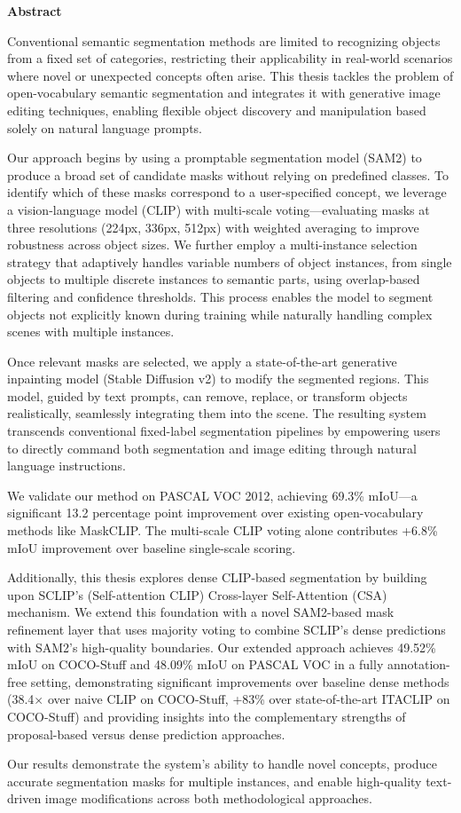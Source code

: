 \vspace{2.5cm}

{\Large \bfseries Abstract}

\vspace{1.5cm}

Conventional semantic segmentation methods are limited to recognizing objects from a fixed set of categories, restricting their applicability in real-world scenarios where novel or unexpected concepts often arise. This thesis tackles the problem of open-vocabulary semantic segmentation and integrates it with generative image editing techniques, enabling flexible object discovery and manipulation based solely on natural language prompts.

Our approach begins by using a promptable segmentation model (SAM2) to produce a broad set of candidate masks without relying on predefined classes. To identify which of these masks correspond to a user-specified concept, we leverage a vision-language model (CLIP) with multi-scale voting—evaluating masks at three resolutions (224px, 336px, 512px) with weighted averaging to improve robustness across object sizes. We further employ a multi-instance selection strategy that adaptively handles variable numbers of object instances, from single objects to multiple discrete instances to semantic parts, using overlap-based filtering and confidence thresholds. This process enables the model to segment objects not explicitly known during training while naturally handling complex scenes with multiple instances.

Once relevant masks are selected, we apply a state-of-the-art generative inpainting model (Stable Diffusion v2) to modify the segmented regions. This model, guided by text prompts, can remove, replace, or transform objects realistically, seamlessly integrating them into the scene. The resulting system transcends conventional fixed-label segmentation pipelines by empowering users to directly command both segmentation and image editing through natural language instructions.

We validate our method on PASCAL VOC 2012, achieving 69.3\% mIoU—a significant 13.2 percentage point improvement over existing open-vocabulary methods like MaskCLIP. The multi-scale CLIP voting alone contributes +6.8\% mIoU improvement over baseline single-scale scoring.

Additionally, this thesis explores dense CLIP-based segmentation by building upon SCLIP's (Self-attention CLIP) Cross-layer Self-Attention (CSA) mechanism. We extend this foundation with a novel SAM2-based mask refinement layer that uses majority voting to combine SCLIP's dense predictions with SAM2's high-quality boundaries. Our extended approach achieves 49.52\% mIoU on COCO-Stuff and 48.09\% mIoU on PASCAL VOC in a fully annotation-free setting, demonstrating significant improvements over baseline dense methods (38.4$\times$ over naive CLIP on COCO-Stuff, +83\% over state-of-the-art ITACLIP on COCO-Stuff) and providing insights into the complementary strengths of proposal-based versus dense prediction approaches.

Our results demonstrate the system's ability to handle novel concepts, produce accurate segmentation masks for multiple instances, and enable high-quality text-driven image modifications across both methodological approaches.
